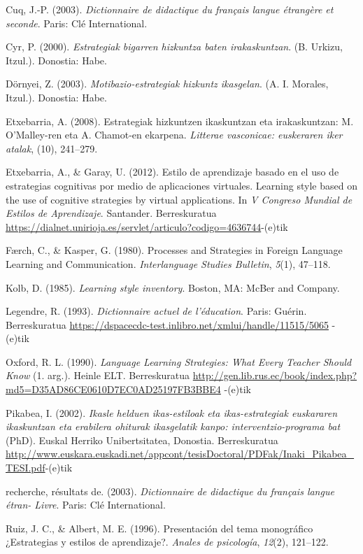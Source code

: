 \documentclass[
]{book}
\begin{document}
Cuq, J.-P. (2003). \emph{Dictionnaire de didactique du français langue étrangère et seconde}. Paris: Clé International.

Cyr, P. (2000). \emph{Estrategiak bigarren hizkuntza baten irakaskuntzan}. (B. Urkizu, Itzul.). Donostia: Habe.

Dörnyei, Z. (2003). \emph{Motibazio-estrategiak hizkuntz ikasgelan}. (A. I. Morales, Itzul.). Donostia: Habe.

Etxebarria, A. (2008). Estrategiak hizkuntzen ikaskuntzan eta irakaskuntzan: M. O'Malley-ren eta A. Chamot-en ekarpena. \emph{Litterae vasconicae: euskeraren iker atalak}, (10), 241--279.

Etxebarria, A., \& Garay, U. (2012). Estilo de aprendizaje basado en el uso de estrategias cognitivas por medio de aplicaciones virtuales. Learning style based on the use of cognitive strategies by virtual applications. In \emph{V Congreso Mundial de Estilos de Aprendizaje}. Santander. Berreskuratua \url{https://dialnet.unirioja.es/servlet/articulo?codigo=4636744}-(e)tik

Færch, C., \& Kasper, G. (1980). Processes and Strategies in Foreign Language Learning and Communication. \emph{Interlanguage Studies Bulletin}, \emph{5}(1), 47--118.

Kolb, D. (1985). \emph{Learning style inventory}. Boston, MA: McBer and Company.

Legendre, R. (1993). \emph{Dictionnaire actuel de l'éducation}. Paris: Guérin. Berreskuratua \url{https://dspacecdc-test.inlibro.net/xmlui/handle/11515/5065} -(e)tik

Oxford, R. L. (1990). \emph{Language Learning Strategies: What Every Teacher Should Know} (1. arg.). Heinle ELT. Berreskuratua \url{http://gen.lib.rus.ec/book/index.php?md5=D35AD86CE0610D7EC0AD25197FB3BBE4} -(e)tik

Pikabea, I. (2002). \emph{Ikasle helduen ikas-estiloak eta ikas-estrategiak euskararen ikaskuntzan eta erabilera ohiturak ikasgelatik kanpo: interventzio-programa bat} (PhD). Euskal Herriko Unibertsitatea, Donostia. Berreskuratua \url{http://www.euskara.euskadi.net/appcont/tesisDoctoral/PDFak/Inaki_Pikabea_TESI.pdf}-(e)tik

recherche, résultats de. (2003). \emph{Dictionnaire de didactique du français langue étran- Livre}. Paris: Clé International.

Ruiz, J. C., \& Albert, M. E. (1996). Presentación del tema monográfico ¿Estrategias y estilos de aprendizaje?. \emph{Anales de psicología}, \emph{12}(2), 121--122.
\end{document}

